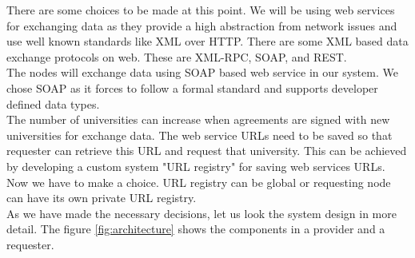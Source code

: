 \documentclass[12pt,a4paper,oneside]{book}
\begin{document}
There are some choices to be made at this point. We will be using web services for exchanging data as they provide a high abstraction from network issues and use well known standards like XML over HTTP. There are some XML based data exchange protocols on web. These are XML-RPC, SOAP, and REST. \\

The nodes will exchange data using SOAP based web service in our system.  We chose SOAP as it forces to follow a formal standard and supports developer defined data types. \\

The number of universities can increase when agreements are signed with new universities for exchange data. The web service URLs need to be saved so that requester can retrieve this URL and request that university. This can be achieved by developing a custom system "URL registry" for saving web services URLs. Now we have to make a choice. URL registry can be global or requesting node can have its own private URL registry. \\

As we have made the necessary decisions, let us look the system design in more detail. The figure \ref{fig:architecture} shows the components in a provider and a requester. 
\end{document}
